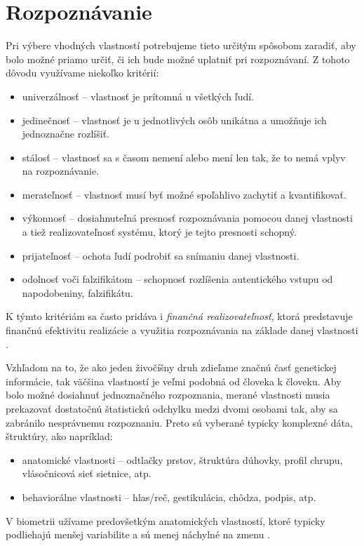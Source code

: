 \section{Rozpoznávanie}
Pri výbere vhodných vlastností potrebujeme tieto určitým spôsobom zaradiť, aby bolo možné priamo určiť, či ich bude možné uplatniť pri rozpoznávaní. Z tohoto dôvodu využívame niekoľko kritérií\cite{bio}\cite{bio2}:
\begin{itemize}
\item univerzálnosť -- vlastnosť je prítomná u všetkých ľudí.
\item jedinečnosť -- vlastnosť je u jednotlivých osôb unikátna a umožňuje ich jednoznačne rozlíšiť.
\item stálosť -- vlastnosť sa s časom nemení alebo mení len tak, že to nemá vplyv na rozpoznávanie.
\item merateľnosť -- vlastnosť musí byť možné spoľahlivo zachytiť a kvantifikovať.
\item výkonnosť -- dosiahnuteľná presnosť rozpoznávania pomocou danej vlastnosti a tiež realizovateľnosť systému, ktorý je tejto presnosti schopný.
\item prijateľnosť -- ochota ľudí podrobiť sa snímaniu danej vlastnosti.
\item odolnosť voči falzifikátom -- schopnosť rozlíšenia autentického vstupu od napodobeniny, falzifikátu.
\end{itemize}
K týmto kritériám sa často pridáva i \emph{finančná realizovateľnosť}, ktorá predstavuje finančnú efektivitu realizácie a využitia rozpoznávania na základe danej vlastnosti \cite{bio}.

Vzhľadom na to, že ako jeden živočíšny druh zdieľame značnú časť genetickej informácie, tak väčšina vlastností je veľmi podobná od človeka k človeku. Aby bolo možné dosiahnuť jednoznačného rozpoznania, merané vlastnosti musia prekazovať dostatočnú štatistickú odchylku medzi dvomi osobami tak, aby sa zabránilo nesprávnemu rozpoznaniu. Preto sú vyberané typicky komplexné dáta, štruktúry, ako napríklad\cite{bio}:
\begin{itemize}
\item anatomické vlastnosti -- odtlačky prstov, štruktúra dúhovky, profil chrupu, vlásočnicová sieť sietnice, atp.
\item behaviorálne vlastnosti -- hlas/reč, gestikulácia, chôdza, podpis, atp.
\end{itemize}
V biometrii užívame predovšetkým anatomických vlastností, ktoré typicky podliehajú menšej variabilite a sú menej náchylné na zmenu \cite{bio3}.

